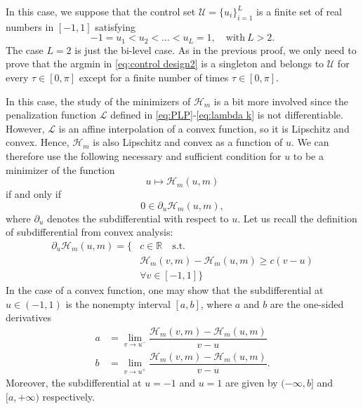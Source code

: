 \documentclass[twocolumn]{autart}    %
\begin{document}
In this case, we suppose that the control set $\mathcal{U} = \{ u_i\}_{i=1}^L$ is a finite set of real numbers in $[-1,1]$ satisfying
$$
-1 = u_1 < u_2 <\ldots <u_L = 1, \quad \text{with} \ L> 2.
$$
The case $L=2$ is just the bi-level case.
As in the previous proof, we only need to prove that the argmin in \eqref{eq:control design2} is a singleton and belongs to $\mathcal{U}$ for every $\tau\in [0,\pi]$ except for a finite number of times $\tau\in [0,\pi]$.


In this case,  the study of the minimizers of $\mathcal{H}_m$ is a bit more involved since the penalization function $\mathcal{L}$ defined in \eqref{eq:PLP}-\eqref{eq:lambda k} is not differentiable.
However,  $\mathcal{L}$ is an affine interpolation of a convex function, so it is Lipschitz and convex.  Hence, $\mathcal{H}_m$ is also Lipschitz and convex as a function of $u$.
We can therefore use the following necessary and sufficient condition for $u$ to be a minimizer of  the function 
$$u\mapsto \mathcal{H}_m (u,m)$$
if and only if
\begin{equation}\label{opti cond subdiff}
0\in \partial_u \mathcal{H}_m (u,m),
\end{equation}
where $\partial_u$ denotes the subdifferential with respect to $u$.
Let us recall the definition of subdifferential from convex analysis:
\begin{align*}
 \partial_u \mathcal{H}_m (u,m) =    \{  & c\in \mathbb{R} \quad \text{s.t.} \\ 
&  \mathcal{H}_m (v,m) - \mathcal{H}_m (u,m) \geq c(v-u) \nonumber  \\ 
 & \forall v\in [-1,1] \} \nonumber
\end{align*}
In the case of a convex function, one may show that the subdifferential at $u\in (-1,1)$ is the nonempty interval $[a,b]$, where $a$ and $b$ are the one-sided derivatives
\begin{align*}
a &= \lim_{v\to u^-} \dfrac{\mathcal{H}_m (v,m) - \mathcal{H}_m(u,m) }{v-u} \\
b &= \lim_{v\to u^+} \dfrac{\mathcal{H}_m (v,m) - \mathcal{H}_m(u,m) }{v-u}. 
\end{align*}
Moreover, the subdifferential at $u=-1$ and $u=1$ are given by $(-\infty, b]$ and $[a,+\infty)$ respectively.
\end{document}
